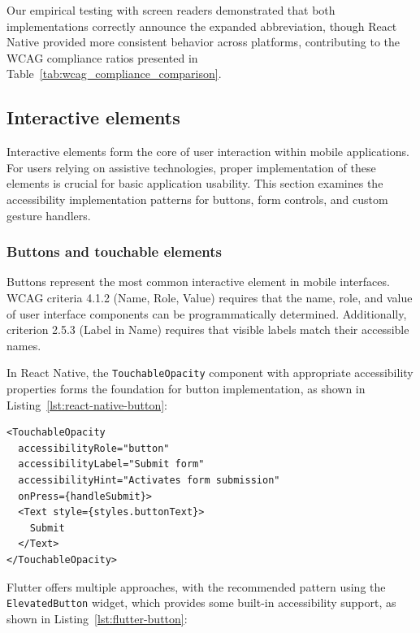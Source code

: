Our empirical testing with screen readers demonstrated that both implementations correctly announce the expanded abbreviation, though React Native provided more consistent behavior across platforms, contributing to the WCAG compliance ratios presented in Table~\ref{tab:wcag_compliance_comparison}.

\subsection{Interactive elements}
\label{subsec:interactive-elements}

Interactive elements form the core of user interaction within mobile applications. For users relying on assistive technologies, proper implementation of these elements is crucial for basic application usability. This section examines the accessibility implementation patterns for buttons, form controls, and custom gesture handlers.

\subsubsection{Buttons and touchable elements}
\label{subsubsec:buttons-implementation}

Buttons represent the most common interactive element in mobile interfaces. WCAG criteria 4.1.2 (Name, Role, Value) requires that the name, role, and value of user interface components can be programmatically determined. Additionally, criterion 2.5.3 (Label in Name) requires that visible labels match their accessible names.

In React Native, the \texttt{TouchableOpacity} component with appropriate accessibility properties forms the foundation for button implementation, as shown in Listing~\ref{lst:react-native-button}:

\begin{lstlisting}[style=ReactNativeStyle, caption=Accessible button in React Native, label=lst:react-native-button]
<TouchableOpacity
  accessibilityRole="button"
  accessibilityLabel="Submit form"
  accessibilityHint="Activates form submission"
  onPress={handleSubmit}>
  <Text style={styles.buttonText}>
    Submit
  </Text>
</TouchableOpacity>
\end{lstlisting}

Flutter offers multiple approaches, with the recommended pattern using the \texttt{ElevatedButton} widget, which provides some built-in accessibility support, as shown in Listing~\ref{lst:flutter-button}:

